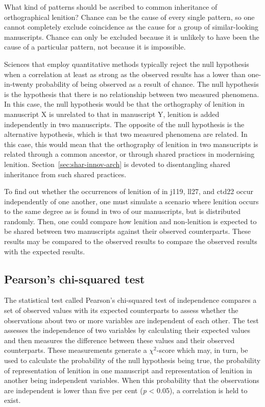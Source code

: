 What kind of patterns should be ascribed to common inheritance of orthographical lenition? Chance can be the cause of every single pattern, so one cannot completely exclude coincidence as the cause for a group of  similar-looking manuscripts. Chance can only be excluded because it is unlikely to have been the cause of a particular pattern, not because it is impossible.

Sciences that employ quantitative methods typically reject the null hypothesis when a correlation at least as strong as the observed results has a lower than one-in-twenty probability of being observed as a result of chance.  The null hypothesis is the hypothesis that there is no relationship between two measured phenomena. In this case,  the null hypothesis would be that the orthography of lenition in manuscript X is unrelated to that in manuscript Y, \ie lenition is added independently in two manuscripts. The opposite of the null hypothesis is the alternative hypothesis, which is  that two measured phenomena are related. In this case, this would mean that the orthography of lenition in two mansucripts is related through a common ancestor, or through shared practices in modernising lenition. Section~\ref{sec:shar-innov-arch} is devoted to disentangling shared inheritance from such shared practices.


To find out whether the occurrences of lenition of  in \gls{j119}, \gls{ll27}, and \gls{ctd22} occur independently of one another, one must simulate a scenario where lenition occurs to the same degree as is found in two of our manuscripts, but is distributed randomly. Then, one could compare how lenition and non-lenition is expected to be shared between two manuscripts against their observed counterparts. These results may  be compared to the observed results to compare the observed results with the expected results.

\subsection{Pearson's chi-squared test }
\label{sec:pearsons-chi-squared}

The statistical test called Pearson's chi-squared test of independence compares a set of observed values with its expected counterparts to assess whether the  observations about two or more variables are independent of each other.
The test assesses the independence of two variables by calculating their expected values and then measures the difference between these values and their observed counterparts. These measurements generate a \(\chi^2\)-score which may, in turn, be used to calculate the probability of the null hypothesis being true, \ie the probability of  representation of lenition in one manuscript and representation of lenition in another being independent variables. When this probability that the observations are independent is lower than five per cent (\emph{p} < 0.05), a correlation is  held to exist.


